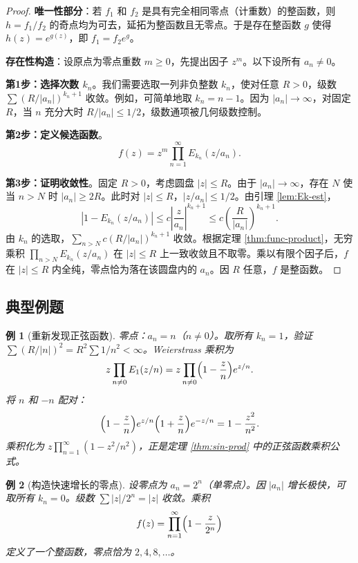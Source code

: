 \documentclass[UTF8]{ctexart}
\newtheorem{example}{例}[section]
\numberwithin{equation}{section}
\begin{document}
\begin{proof}
\textbf{唯一性部分}：若 \(f_1\) 和 \(f_2\) 是具有完全相同零点（计重数）的整函数，则 \(h = f_1/f_2\) 的奇点均为可去，延拓为整函数且无零点。于是存在整函数 \(g\) 使得 \(h(z) = e^{g(z)}\)，即 \(f_1 = f_2 e^g\)。

\textbf{存在性构造}：设原点为零点重数 \(m \ge 0\)，先提出因子 \(z^m\)。以下设所有 \(a_n \neq 0\)。

\textbf{第1步：选择次数 \(k_n\)}。我们需要选取一列非负整数 \(k_n\)，使对任意 \(R > 0\)，级数 \(\sum (R/|a_n|)^{k_n+1}\) 收敛。例如，可简单地取 \(k_n = n-1\)。因为 \(|a_n| \to \infty\)，对固定 \(R\)，当 \(n\) 充分大时 \(R/|a_n| \le 1/2\)，级数通项被几何级数控制。

\textbf{第2步：定义候选函数}。
\[
f(z) = z^m \prod_{n=1}^\infty E_{k_n}(z/a_n).
\]

\textbf{第3步：证明收敛性}。固定 \(R > 0\)，考虑圆盘 \(|z| \le R\)。由于 \(|a_n| \to \infty\)，存在 \(N\) 使当 \(n > N\) 时 \(|a_n| \ge 2R\)。此时对 \(|z| \le R\)，\(|z/a_n| \le 1/2\)。由引理 \ref{lem:Ek-est}，
\[
|1 - E_{k_n}(z/a_n)| \le c \left| \frac{z}{a_n} \right|^{k_n+1} \le c \left( \frac{R}{|a_n|} \right)^{k_n+1}.
\]
由 \(k_n\) 的选取，\(\sum_{n > N} c (R/|a_n|)^{k_n+1}\) 收敛。根据定理 \ref{thm:func-product}，无穷乘积 \(\prod_{n > N} E_{k_n}(z/a_n)\) 在 \(|z| \le R\) 上一致收敛且不取零。乘以有限个因子后，\(f\) 在 \(|z| \le R\) 内全纯，零点恰为落在该圆盘内的 \(a_n\)。因 \(R\) 任意，\(f\) 是整函数。
\end{proof}

\subsection{典型例题}

\begin{example}[重新发现正弦函数]
零点：\(a_n = n\)（\(n \neq 0\)）。取所有 \(k_n = 1\)，验证 \(\sum (R/|n|)^2 = R^2 \sum 1/n^2 < \infty\)。Weierstrass 乘积为
\[
z \prod_{n \neq 0} E_1(z/n) = z \prod_{n \neq 0} \Bigl( 1 - \frac{z}{n} \Bigr) e^{z/n}.
\]
将 \(n\) 和 \(-n\) 配对：
\[
\Bigl( 1 - \frac{z}{n} \Bigr) e^{z/n} \Bigl( 1 + \frac{z}{n} \Bigr) e^{-z/n} = 1 - \frac{z^2}{n^2}.
\]
乘积化为 \(z \prod_{n=1}^\infty (1 - z^2/n^2)\)，正是定理 \ref{thm:sin-prod} 中的正弦函数乘积公式。
\end{example}

\begin{example}[构造快速增长的零点]
设零点为 \(a_n = 2^n\)（单零点）。因 \(|a_n|\) 增长极快，可取所有 \(k_n = 0\)。级数 \(\sum |z|/2^n = |z|\) 收敛。乘积
\[
f(z) = \prod_{n=1}^\infty \Bigl( 1 - \frac{z}{2^n} \Bigr)
\]
定义了一个整函数，零点恰为 \(2, 4, 8, \dots\)。
\end{example}
\end{document}
